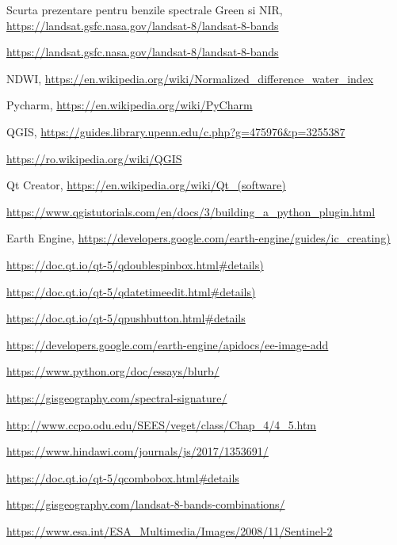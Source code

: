\documentclass[12pt,a4paper]{article}
\theoremstyle{definition}
\theoremstyle{remark}
\begin{document}
\begin{thebibliography}{9}
   Scurta prezentare pentru benzile spectrale Green si NIR,
    \url{https://landsat.gsfc.nasa.gov/landsat-8/landsat-8-bands}
    
   \url{https://landsat.gsfc.nasa.gov/landsat-8/landsat-8-bands}
   
    NDWI,
    \url{https://en.wikipedia.org/wiki/Normalized_difference_water_index}
    
   Pycharm,
    \url{https://en.wikipedia.org/wiki/PyCharm}
    
   QGIS,
    \url{https://guides.library.upenn.edu/c.php?g=475976&p=3255387}
    
   
    \url{https://ro.wikipedia.org/wiki/QGIS}
    
   Qt Creator,
    \url{https://en.wikipedia.org/wiki/Qt_(software)}
    
   
    \url{https://www.qgistutorials.com/en/docs/3/building_a_python_plugin.html}
    
   Earth Engine,
    \url{https://developers.google.com/earth-engine/guides/ic_creating)}
    
    \url{https://doc.qt.io/qt-5/qdoublespinbox.html#details)}
    
    \url{https://doc.qt.io/qt-5/qdatetimeedit.html#details)}
    
    \url{https://doc.qt.io/qt-5/qpushbutton.html#details}
    
    \url{https://developers.google.com/earth-engine/apidocs/ee-image-add}
    
    \url{https://www.python.org/doc/essays/blurb/}
    
    \url{https://gisgeography.com/spectral-signature/}
    
    \url{http://www.ccpo.odu.edu/SEES/veget/class/Chap_4/4_5.htm}
    
    
    \url{https://www.hindawi.com/journals/js/2017/1353691/}
    
    \url{https://doc.qt.io/qt-5/qcombobox.html#details}
    
    \url{https://gisgeography.com/landsat-8-bands-combinations/}
    
    \url{https://www.esa.int/ESA_Multimedia/Images/2008/11/Sentinel-2}
    
    
    
    
    
\end{thebibliography}
\end{document}
